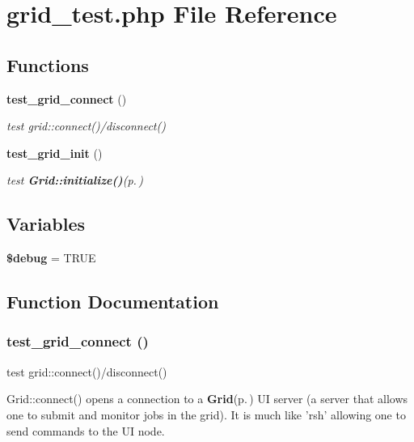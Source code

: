 \section{grid\_\-test.php File Reference}
\label{grid__test_8php}
\subsection*{Functions}
\begin{CompactItemize}
\item 
{\bf test\_\-grid\_\-connect} ()
\begin{CompactList}\small\item\em test grid::connect()/disconnect() \item\end{CompactList}\item 
{\bf test\_\-grid\_\-init} ()
\begin{CompactList}\small\item\em test {\bf Grid::initialize()}{\rm (p.\,\pageref{grid_8php_a0})} \item\end{CompactList}\end{CompactItemize}
\subsection*{Variables}
\begin{CompactItemize}
\item 
{\bf \$debug} = TRUE
\end{CompactItemize}


\subsection{Function Documentation}
\subsubsection{\setlength{\rightskip}{0pt plus 5cm}test\_\-grid\_\-connect ()}\label{grid__test_8php_a1}


test grid::connect()/disconnect() 

Grid::connect() opens a connection to a {\bf Grid}{\rm (p.\,\pageref{classGrid})} UI server (a server that allows one to submit and monitor jobs in the grid). It is much like 'rsh' allowing one to send commands to the UI node.

